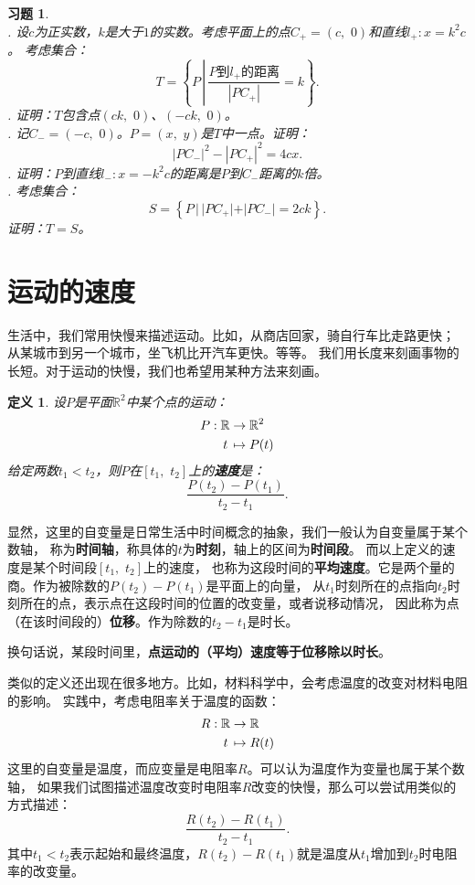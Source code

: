 \documentclass[12pt,UTF8]{ctexbook}
\newtheorem{df}{定义}[section]
\newtheorem{xt}{习题}[section]
\begin{document}
\begin{xt}
    \mbox{} \\
    . 设$c$为正实数，$k$是大于$1$的实数。考虑平面上的点$C_+ = (c,\,\, 0)$和直线$l_+ : x = k^2c$。
    考虑集合：
    $$T = \left\{P\,\left| \, \frac{P\mbox{到}l_+\mbox{的距离}}{|PC_+|} = k\right.\right\}.$$
    . 证明：$T$包含点$(ck, \,\,0)$、$(-ck,\,\,0)$。\\
    . 记$C_- = (-c,\,\,0)$。$P = (x,\,\, y)$是$T$中一点。证明：
    $$ |PC_-|^2 - |PC_+|^2 = 4cx.$$
    . 证明：$P$到直线$l_-: x = -k^2c$的距离是$P$到$C_-$距离的$k$倍。\\
    . 考虑集合：
    $$ S = \left\{P\,| \, |PC_+| + |PC_-| = 2ck\right\}.$$
    证明：$T = S$。
\end{xt}

\section{运动的速度}
生活中，我们常用快慢来描述运动。比如，从商店回家，骑自行车比走路更快；
从某城市到另一个城市，坐飞机比开汽车更快。等等。
我们用长度来刻画事物的长短。对于运动的快慢，我们也希望用某种方法来刻画。

\begin{df}
    设$P$是平面$\mathbb{R}^2$中某个点的运动：
    \begin{align}
        P: \mathbb{R} &\rightarrow \mathbb{R}^2 \notag \\
             t \, &\mapsto P(t) \notag
    \end{align}
    给定两数$t_1 < t_2$，则$P$在$[t_1,\,\,t_2]$上的\textbf{速度}是：
    $$ \frac{P(t_2) - P(t_1)}{t_2 - t_1}.$$
\end{df}
显然，这里的自变量是日常生活中时间概念的抽象，我们一般认为自变量属于某个数轴，
称为\textbf{时间轴}，称具体的$t$为\textbf{时刻}，轴上的区间为\textbf{时间段}。
而以上定义的速度是某个时间段$[t_1,\,\,t_2]$上的速度，
也称为这段时间的\textbf{平均速度}。它是两个量的商。作为被除数的$P(t_2) - P(t_1)$是平面上的向量，
从$t_1$时刻所在的点指向$t_2$时刻所在的点，表示点在这段时间的位置的改变量，或者说移动情况，
因此称为点（在该时间段的）\textbf{位移}。作为除数的$t_2 - t_1$是时长。

换句话说，某段时间里，\textbf{点运动的（平均）速度等于位移除以时长}。

类似的定义还出现在很多地方。比如，材料科学中，会考虑温度的改变对材料电阻的影响。
实践中，考虑电阻率关于温度的函数：
\begin{align}
    R: \mathbb{R} &\rightarrow \mathbb{R} \notag \\
         t \, &\mapsto R(t) \notag
\end{align}
这里的自变量是温度，而应变量是电阻率$R$。可以认为温度作为变量也属于某个数轴，
如果我们试图描述温度改变时电阻率$R$改变的快慢，那么可以尝试用类似的方式描述：
$$ \frac{R(t_2) - R(t_1)}{t_2 - t_1}.$$
其中$t_1 < t_2$表示起始和最终温度，$R(t_2) - R(t_1)$就是温度从$t_1$增加到$t_2$时电阻率的改变量。
\end{document}
